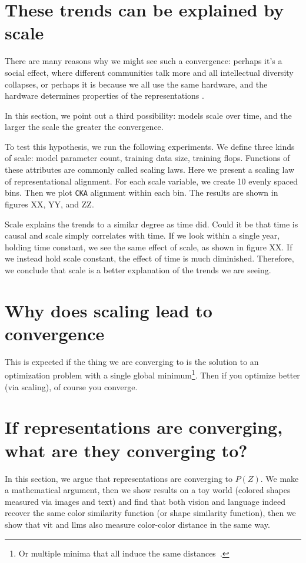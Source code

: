 \documentclass{article}
\theoremstyle{plain}
\theoremstyle{definition}
\theoremstyle{remark}
\begin{document}
\section{These trends can be explained by scale}

There are many reasons why we might see such a convergence: perhaps it's a social effect, where different communities talk more and all intellectual diversity collapses, or perhaps it is because we all use the same hardware, and the hardware determines properties of the representations \cite{hardware lottery}.

In this section, we point out a third possibility: models scale over time, and the larger the scale the greater the convergence.

To test this hypothesis, we run the following experiments. We define three kinds of scale: model parameter count, training data size, training flops. Functions of these attributes are commonly called scaling laws. Here we present a scaling law of representational alignment. For each scale variable, we create 10 evenly spaced bins. Then we plot \texttt{CKA} alignment within each bin. The results are shown in figures XX, YY, and ZZ.

Scale explains the trends to a similar degree as time did. Could it be that time is causal and scale simply correlates with time. If we look within a single year, holding time constant, we see the same effect of scale, as shown in figure XX. If we instead hold scale constant, the effect of time is much diminished. Therefore, we conclude that scale is a better explanation of the trends we are seeing.

\section{Why does scaling lead to convergence}

This is expected if the thing we are converging to is the solution to an optimization problem with a single global minimum\footnote{Or multiple minima that all induce the same distances~\cite{permutation invariance works}.}. Then if you optimize better (via scaling), of course you converge.


\section{If representations are converging, what are they converging to?}

In this section, we argue that representations are converging to $P(Z)$. We make a mathematical argument, then we show results on a toy world (colored shapes measured via images and text) and find that both vision and language indeed recover the same color similarity function (or shape similarity function), then we show that vit and llms also measure color-color distance in the same way.
\end{document}

